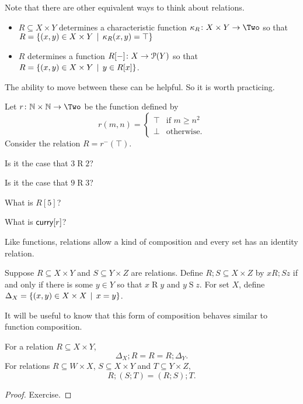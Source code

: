Note that there are other equivalent ways to think about relations. 
\begin{itemize}
	\item $R\subseteq X\times Y$ determines a characteristic function $\fromto {\kappa_R}{X\times Y}\Two$ so that $R = \{(x,y)\in X\times Y\,\mid\, \kappa_R(x,y)=\top\}$
	\item $R$ determines a function ${R[-]}\colon{X}\to{{\mathcal{P}}(Y)}$ so that $R = \{(x,y)\in X\times Y\,\mid\, y\in R[x]\}$.
\end{itemize}
The ability to move between these can be helpful.
So it is worth practicing.

\begin{exercises}
	Let $\fromto r{\NN\times\NN}\Two$ be the function defined by \[r(m,n) = \begin{cases}
	\top & \text{if $m\geq n^2$}\\
	\bot & \text{otherwise}.
	\end{cases}
	\]
	Consider the relation $R = r^{-}(\top)$.
	\begin{firstexercise}
		\item Is it the case that $3\mathrel{R} 2$?
		\item Is it the case that $9\mathrel{R} 3$?
		\item What is $R[5]$?
		\item What is $\mathord{\textsf{curry}}[r]$?
	\end{firstexercise}
\end{exercises}

Like functions, relations allow a kind of composition and every set has an identity relation.

\begin{defn}
	Suppose $R\subseteq X\times Y$ and $S\subseteq Y\times Z$ are relations. 
	Define $R;S\subseteq X\times Z$ by $x\mathrel{R;S}z$ if and only if there is some $y\in Y$ so that $x\mathrel{R}y$ and $y\mathrel{S}z$.
	For set $X$, define $\Delta_X = \{(x,y)\in X\times X\,\mid\, x=y\}$.	
\end{defn}

It will be useful to know that this form of composition behaves similar to function composition.

\begin{lemma}
	For a relation $R\subseteq X\times Y$, 
	\[\Delta_X;R = R = R;\Delta_Y.\] 
	For relations $R\subseteq W\times X$, $S\subseteq X\times Y$ and $T\subseteq Y\times Z$,
	\[R;(S;T) = (R;S);T.\]
	
	\begin{proof}
		Exercise.
	\end{proof}
\end{lemma}

